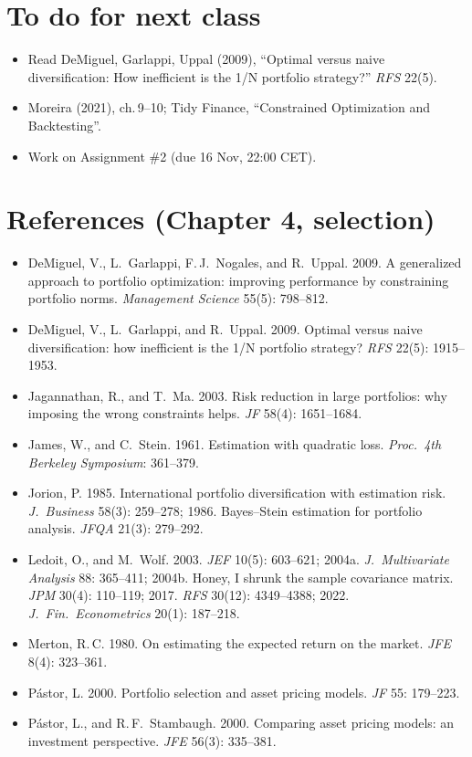\documentclass[11pt,a4paper]{report}
\begin{document}
\section{To do for next class}
\begin{itemize}
  \item Read DeMiguel, Garlappi, Uppal (2009), ``Optimal versus naive diversification:
    How inefficient is the 1/N portfolio strategy?'' \emph{RFS} 22(5).
  \item Moreira (2021), ch.\,9--10; Tidy Finance, ``Constrained Optimization and Backtesting''.
  \item Work on Assignment \#2 (due 16 Nov, 22:00 CET).
\end{itemize}

\section*{References (Chapter 4, selection)}
\begin{itemize}[leftmargin=*]\small
\item DeMiguel, V., L.~Garlappi, F.\,J.~Nogales, and R.~Uppal. 2009. A generalized approach to portfolio optimization: improving performance by constraining portfolio norms. \emph{Management Science} 55(5): 798--812.
\item DeMiguel, V., L.~Garlappi, and R.~Uppal. 2009. Optimal versus naive diversification: how inefficient is the 1/N portfolio strategy? \emph{RFS} 22(5): 1915--1953.
\item Jagannathan, R., and T.~Ma. 2003. Risk reduction in large portfolios: why imposing the wrong constraints helps. \emph{JF} 58(4): 1651--1684.
\item James, W., and C.~Stein. 1961. Estimation with quadratic loss. \emph{Proc.\ 4th Berkeley Symposium}: 361--379.
\item Jorion, P. 1985. International portfolio diversification with estimation risk. \emph{J.\ Business} 58(3): 259--278; 1986. Bayes--Stein estimation for portfolio analysis. \emph{JFQA} 21(3): 279--292.
\item Ledoit, O., and M.~Wolf. 2003. \emph{JEF} 10(5): 603--621; 2004a. \emph{J.\ Multivariate Analysis} 88: 365--411; 2004b. Honey, I shrunk the sample covariance matrix. \emph{JPM} 30(4): 110--119; 2017. \emph{RFS} 30(12): 4349--4388; 2022. \emph{J.\ Fin.\ Econometrics} 20(1): 187--218.
\item Merton, R.\,C. 1980. On estimating the expected return on the market. \emph{JFE} 8(4): 323--361.
\item P\'astor, L. 2000. Portfolio selection and asset pricing models. \emph{JF} 55: 179--223.
\item Pástor, L., and R.\,F.~Stambaugh. 2000. Comparing asset pricing models: an investment perspective. \emph{JFE} 56(3): 335--381.
\end{itemize}
\end{document}
